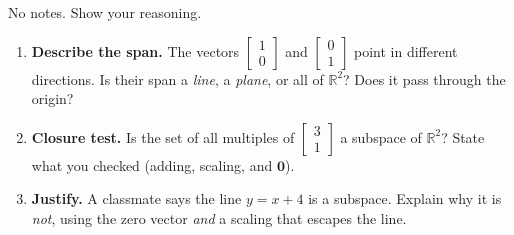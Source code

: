 \documentclass[10pt]{article}
\newcommand{\zero}{\mathbf{0}}
\begin{document}
\namedateperiod

\vspace{0.15in}

No notes. Show your reasoning.

\begin{enumerate}[leftmargin=1.8em, itemsep=16pt]
  \item \textbf{Describe the span.} The vectors $\begin{bmatrix} 1 \\ 0 \end{bmatrix}$ and
        $\begin{bmatrix} 0 \\ 1 \end{bmatrix}$ point in different directions. Is their span a
        \emph{line}, a \emph{plane}, or all of $\mathbb{R}^2$? Does it pass through the origin?
        \vspace{0.9cm}
  \item \textbf{Closure test.} Is the set of all multiples of $\begin{bmatrix} 3 \\ 1 \end{bmatrix}$
        a subspace of $\mathbb{R}^2$? State what you checked (adding, scaling, and $\zero$).
        \vspace{1.3cm}
  \item \textbf{Justify.} A classmate says the line $y = x + 4$ is a subspace. Explain why it is
        \emph{not}, using the zero vector \emph{and} a scaling that escapes the line.
\end{enumerate}
\end{document}
